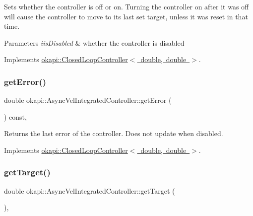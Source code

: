 Sets whether the controller is off or on. Turning the controller on after it was off will cause the controller to move to its last set target, unless it was reset in that time.


\begin{DoxyParams}{Parameters}
{\em iis\+Disabled} & whether the controller is disabled \\
\hline
\end{DoxyParams}


Implements \mbox{\hyperlink{classokapi_1_1ClosedLoopController_a768cd1db40ce9cd5c89b20be6e838ccc}{okapi\+::\+Closed\+Loop\+Controller$<$ double, double $>$}}.

\mbox{\label{classokapi_1_1AsyncVelIntegratedController_a6641352cebd3f0baa4e3e1ab4ad27be3}} 
\subsubsection{\texorpdfstring{getError()}{getError()}}
{\footnotesize\ttfamily double okapi\+::\+Async\+Vel\+Integrated\+Controller\+::get\+Error (\begin{DoxyParamCaption}{ }\end{DoxyParamCaption}) const\hspace{0.3cm}{\ttfamily [override]}, {\ttfamily [virtual]}}

Returns the last error of the controller. Does not update when disabled. 

Implements \mbox{\hyperlink{classokapi_1_1ClosedLoopController_a50c73444ff6e3e631951c43d0f951953}{okapi\+::\+Closed\+Loop\+Controller$<$ double, double $>$}}.

\mbox{\label{classokapi_1_1AsyncVelIntegratedController_a030ca47508587f799dfdd7d97ed86d7d}} 
\subsubsection{\texorpdfstring{getTarget()}{getTarget()}}
{\footnotesize\ttfamily double okapi\+::\+Async\+Vel\+Integrated\+Controller\+::get\+Target (\begin{DoxyParamCaption}{ }\end{DoxyParamCaption})\hspace{0.3cm}{\ttfamily [override]}, {\ttfamily [virtual]}}

